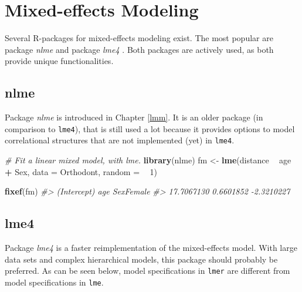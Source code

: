 \documentclass[]{book}
\newenvironment{Shaded}{\begin{snugshade}}{\end{snugshade}}
\newcommand{\KeywordTok}[1]{\textcolor[rgb]{0.13,0.29,0.53}{\textbf{#1}}}
\newcommand{\DataTypeTok}[1]{\textcolor[rgb]{0.13,0.29,0.53}{#1}}
\newcommand{\DecValTok}[1]{\textcolor[rgb]{0.00,0.00,0.81}{#1}}
\newcommand{\StringTok}[1]{\textcolor[rgb]{0.31,0.60,0.02}{#1}}
\newcommand{\CommentTok}[1]{\textcolor[rgb]{0.56,0.35,0.01}{\textit{#1}}}
\newcommand{\OperatorTok}[1]{\textcolor[rgb]{0.81,0.36,0.00}{\textbf{#1}}}
\newcommand{\NormalTok}[1]{#1}
\begin{document}
\section{Mixed-effects Modeling}\label{mixed-effects-modeling}


Several R-packages for mixed-effects modeling exist. The most popular
are package \emph{nlme} \citep{R-nlme} and package \emph{lme4}
\citep{Bates2015}. Both packages are actively used, as both provide
unique functionalities.

\subsection{nlme}\label{nlme}


Package \emph{nlme} is introduced in Chapter \ref{lmm}. It is an older
package (in comparison to \texttt{lme4}), that is still used a lot
because it provides options to model correlational structures that are
not implemented (yet) in \texttt{lme4}.

\begin{Shaded}
\begin{Highlighting}[]
\CommentTok{# Fit a linear mixed model, with lme.}
\KeywordTok{library}\NormalTok{(nlme)}
\NormalTok{fm <-}\StringTok{ }\KeywordTok{lme}\NormalTok{(distance }\OperatorTok{~}\StringTok{ }\NormalTok{age }\OperatorTok{+}\StringTok{ }\NormalTok{Sex, }\DataTypeTok{data =}\NormalTok{ Orthodont, }\DataTypeTok{random =} \OperatorTok{~}\StringTok{ }\DecValTok{1}\NormalTok{)}

\KeywordTok{fixef}\NormalTok{(fm)}
\CommentTok{#> (Intercept)         age   SexFemale }
\CommentTok{#>  17.7067130   0.6601852  -2.3210227}
\end{Highlighting}
\end{Shaded}

\subsection{lme4}\label{lme4}


Package \emph{lme4} \citep{Bates2015} is a faster reimplementation of
the mixed-effects model. With large data sets and complex hierarchical
models, this package should probably be preferred. As can be seen below,
model specifications in \texttt{lmer} are different from model
specifications in \texttt{lme}.
\end{document}
